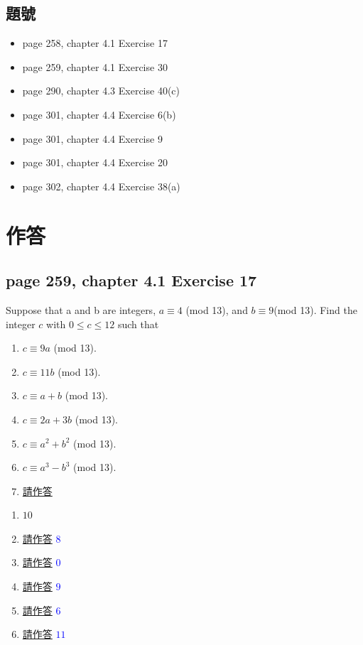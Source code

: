 \documentclass[sigconf]{acmart}
\newcommand{\answer}[2]{%
  \if\relax\detokenize{#2}\relax
    \underline{\mbox{請作答}}%
  \else
    \textcolor{blue}{#2}%
  \fi
}
\begin{document}
\subsection{題號}
\begin{shaded}
\begin{itemize}
        \item[-] page 258, chapter 4.1 Exercise 17
	\item[-] page 259, chapter 4.1 Exercise 30
	\item[-] page 290, chapter 4.3 Exercise 40(c)
	\item[-] page 301, chapter 4.4 Exercise 6(b)
        \item[-] page 301, chapter 4.4 Exercise 9
	\item[-] page 301, chapter 4.4 Exercise 20	
        \item[-] page 302, chapter 4.4 Exercise 38(a)
\end{itemize}
\end{shaded}


\section{作答}
\subsection{page 259, chapter 4.1 Exercise 17}
\begin{shaded}
    Suppose that a and b are integers, $a \equiv 4$ (mod 13), and $b \equiv 9 $(mod 13). Find the integer $c$ with $0 \le c \le 12$ such that
    \begin{enumerate}[label=(\alph*)]
        \item $c \equiv 9a$ (mod 13).
    	\item $c \equiv 11b$ (mod 13).
    	\item $c \equiv a+b$ (mod 13).
        \item $c \equiv 2a+3b$ (mod 13).
        \item $c \equiv a^2+b^2$ (mod 13).
        \item $c \equiv a^3-b^3$ (mod 13).
	\item \answer{4.1.17a}{}

	
\end{enumerate}
\end{shaded}  
\begin{enumerate}[label=(\alph*)]
	\item $10$
	\item \answer{4.1.17b}{$8$}
	\item \answer{4.1.17c}{$0$}
	\item \answer{4.1.17d}{$9$}
	\item \answer{4.1.17e}{$6$}
	\item \answer{4.1.17f}{$11$}
\end{enumerate}
\end{document}
